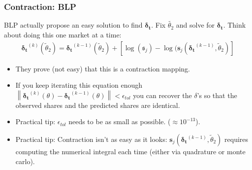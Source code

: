 \documentclass[xcolor=pdftex,dvipsnames,table,mathserif,aspectratio=169]{beamer}
\newcommand{\norm}[1]{\left\lVert#1\right\rVert}
\begin{document}
\begin{frame}
\frametitle{Contraction: BLP}
BLP actually propose an easy solution to find $\boldsymbol{\delta_t}$. Fix $\widetilde{\theta_2}$ and solve for $\boldsymbol{\delta_t}$. Think about doing this one market at a time:
\begin{align*}
\boldsymbol{\delta_t}^{(k)}(\widetilde{\theta}_2) = \boldsymbol{\delta_t}^{(k-1)}(\widetilde{\theta}_2) + \left[ \log(\boldsymbol{\mathfrak{s}}_{j}) - \log(\boldsymbol{s}_{j}(\boldsymbol{\delta_t}^{(k-1)}, \widetilde{\theta}_2) \right]
\end{align*}
 \begin{itemize}
 \item They prove (not easy) that this is a \alert{contraction mapping}.
 \item If you keep iterating this equation enough $\norm{\boldsymbol{\delta_{t}}^{(k)}(\theta) - \boldsymbol{\delta_{t}}^{(k-1)}(\theta)} < \epsilon_{tol}$ you can recover the $\delta$'s so that the observed shares and the predicted shares are identical.
 \item Practical tip: $\epsilon_{tol}$ needs to be as small as possible. ($\approx 10^{-13}$).
 \item Practical tip: Contraction isn't as easy as it looks:  $\boldsymbol{s}_{j}(\boldsymbol{\delta_t}^{(k-1)}, \widetilde{\theta}_2)$ requires computing the numerical integral each time (either via quadrature or monte carlo).
  \end{itemize}
 \end{frame}
 
\end{document}
